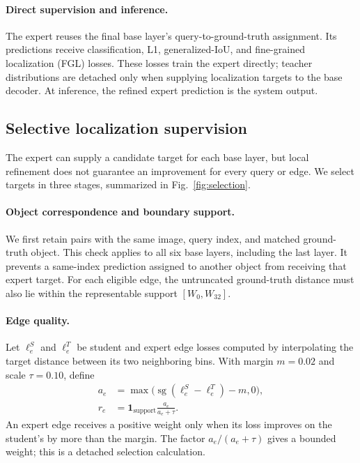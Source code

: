 \paragraph{Direct supervision and inference.}
The expert reuses the final base layer's query-to-ground-truth assignment. Its predictions receive classification, L1, generalized-IoU, and fine-grained localization (FGL) losses. These losses train the expert directly; teacher distributions are detached only when supplying localization targets to the base decoder. At inference, the refined expert prediction is the system output.

\subsection{Selective localization supervision}
The expert can supply a candidate target for each base layer, but local refinement does not guarantee an improvement for every query or edge. We select targets in three stages, summarized in Fig.~\ref{fig:selection}.


\paragraph{Object correspondence and boundary support.}
We first retain pairs with the same image, query index, and matched ground-truth object. This check applies to all six base layers, including the last layer. It prevents a same-index prediction assigned to another object from receiving that expert target. For each eligible edge, the untruncated ground-truth distance must also lie within the representable support $[W_0,W_{32}]$.

\paragraph{Edge quality.}
Let $\ell^S_e$ and $\ell^T_e$ be student and expert edge losses computed by interpolating the target distance between its two neighboring bins. With margin $m=0.02$ and scale $\tau=0.10$, define
\begin{equation}
\begin{aligned}
a_e&=\max\bigl(\operatorname{sg}(\ell^S_e-\ell^T_e)-m,0\bigr),\\
r_e&=\mathbf{1}_{\mathrm{support}}\frac{a_e}{a_e+\tau}.
\end{aligned}
\label{eq:edgeweight}
\end{equation}
An expert edge receives a positive weight only when its loss improves on the student's by more than the margin. The factor $a_e/(a_e+\tau)$ gives a bounded weight; this is a detached selection calculation.

